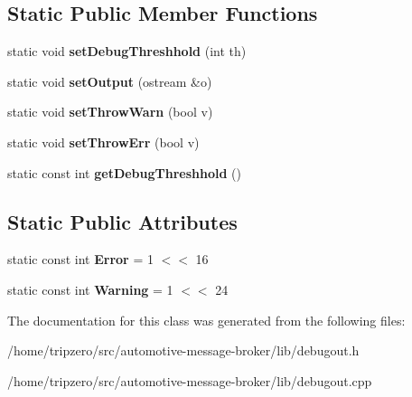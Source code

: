 \subsection*{Static Public Member Functions}
\begin{DoxyCompactItemize}
\item 
\hypertarget{classDebugOut_a5eb2fb8c9db45f812b5dadb2fd63dcee}{static void {\bfseries set\-Debug\-Threshhold} (int th)}\label{classDebugOut_a5eb2fb8c9db45f812b5dadb2fd63dcee}

\item 
\hypertarget{classDebugOut_a89fc39319cc80007a0188b831fae32c1}{static void {\bfseries set\-Output} (ostream \&o)}\label{classDebugOut_a89fc39319cc80007a0188b831fae32c1}

\item 
\hypertarget{classDebugOut_a0651b00c0d62d93a9c57209874b2650c}{static void {\bfseries set\-Throw\-Warn} (bool v)}\label{classDebugOut_a0651b00c0d62d93a9c57209874b2650c}

\item 
\hypertarget{classDebugOut_a59402f0300c1b41f7290c8274cd08c58}{static void {\bfseries set\-Throw\-Err} (bool v)}\label{classDebugOut_a59402f0300c1b41f7290c8274cd08c58}

\item 
\hypertarget{classDebugOut_af4903a2f68a012000cc91562d0183e2a}{static const int {\bfseries get\-Debug\-Threshhold} ()}\label{classDebugOut_af4903a2f68a012000cc91562d0183e2a}

\end{DoxyCompactItemize}
\subsection*{Static Public Attributes}
\begin{DoxyCompactItemize}
\item 
\hypertarget{classDebugOut_a40314aef0df2ed8a705d9372d49b0535}{static const int {\bfseries Error} = 1 $<$$<$ 16}\label{classDebugOut_a40314aef0df2ed8a705d9372d49b0535}

\item 
\hypertarget{classDebugOut_a7a06aa04dd6cb8c1e9bcd083d30d91ad}{static const int {\bfseries Warning} = 1 $<$$<$ 24}\label{classDebugOut_a7a06aa04dd6cb8c1e9bcd083d30d91ad}

\end{DoxyCompactItemize}


The documentation for this class was generated from the following files\-:\begin{DoxyCompactItemize}
\item 
/home/tripzero/src/automotive-\/message-\/broker/lib/debugout.\-h\item 
/home/tripzero/src/automotive-\/message-\/broker/lib/debugout.\-cpp\end{DoxyCompactItemize}
